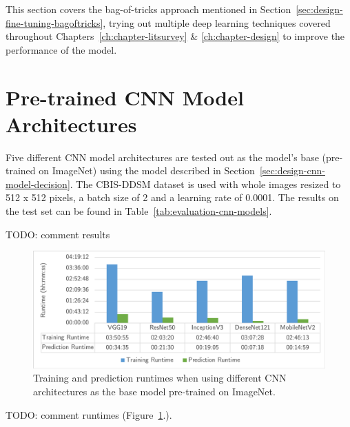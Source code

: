 
This section covers the bag-of-tricks approach mentioned in Section~\ref{sec:design-fine-tuning-bagoftricks}, trying out multiple deep learning techniques covered throughout Chapters~\ref{ch:chapter-litsurvey} \& \ref{ch:chapter-design} to improve the performance of the model.

\section{Pre-trained CNN Model Architectures}

Five different CNN model architectures are tested out as the model's base (pre-trained on ImageNet) using the model described in Section~\ref{sec:design-cnn-model-decision}. The CBIS-DDSM dataset is used with whole images resized to 512 x 512 pixels, a batch size of 2 and a learning rate of 0.0001. The results on the test set can be found in Table~\ref{tab:evaluation-cnn-models}.



TODO: comment results

\begin{figure}[ht]
\centerline{\includegraphics[width=\textwidth]{figures/evaluation/CNN_models_experiment/runtimes.png}}
\caption{\label{fig:evaluation-CNN_models_experiment-runtimes}Training and prediction runtimes when using different CNN architectures as the base model pre-trained on ImageNet.}
\end{figure}

TODO: comment runtimes (Figure~\ref{fig:evaluation-CNN_models_experiment-runtimes}.).

